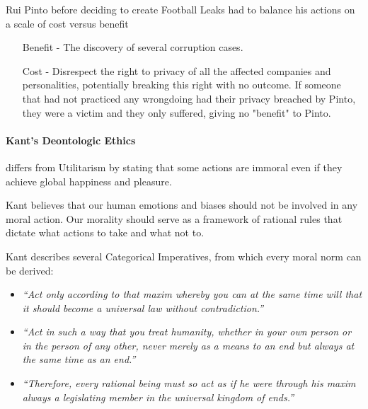     Rui Pinto before deciding to create Football Leaks had to balance his actions on a scale of cost versus benefit
    \begin{enumerate}
        \item [Benefit] - The discovery of several corruption cases.
        \item [Cost] - Disrespect the right to privacy of all the affected companies and personalities, potentially breaking this right with no outcome.
        If someone that had not practiced any wrongdoing had their privacy breached by Pinto, they were a victim and they only suffered, giving no "benefit" to Pinto.
    \end{enumerate}

%    
%
\paragraph{Kant's Deontologic Ethics}
    differs from Utilitarism by stating that some actions are immoral even if they achieve global happiness and pleasure.
    
    Kant believes that our human emotions and biases should not be involved in any  moral action.
    Our morality should serve as a framework of rational rules that dictate what actions to take and what not to.
    
    Kant describes several Categorical Imperatives, from which every moral norm can be derived:
    \begin{itemize}
        \item \textit{“Act only according to that maxim whereby you can at the same time will that it should become a universal law without contradiction.”}
        \item \textit{“Act in such a way that you treat humanity, whether in your own person or in the person of any other, never merely as a means to an end but always at the same time as an end.” }
        \item \textit{“Therefore, every rational being must so act as if he were through his maxim always a legislating member in the universal kingdom of ends.”}
    \end{itemize}
    
